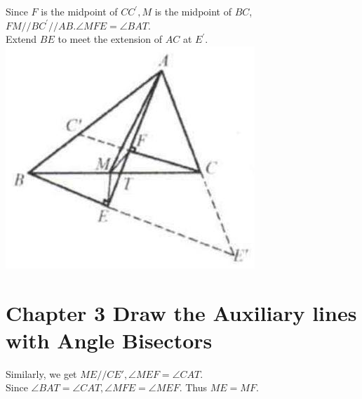 \documentclass[10pt]{article}
\begin{document}
Since \(F\) is the midpoint of \(C C^{\prime}, M\) is the midpoint of \(B C\), \(F M / / B C^{\prime} / / A B . \angle M F E=\angle B A T\).\\
Extend \(B E\) to meet the extension of \(A C\) at \(E^{\prime}\).\\
\includegraphics[max width=\textwidth, center]{2025_04_17_97bc1f7e44d93c271a88g-068(1)}

\section*{Chapter 3 Draw the Auxiliary lines with Angle Bisectors}
Similarly, we get \(M E / / C E \prime, \angle M E F=\angle C A T\).\\
Since \(\angle B A T=\angle C A T, \angle M F E=\angle M E F\). Thus \(M E=M F\).
\end{document}
